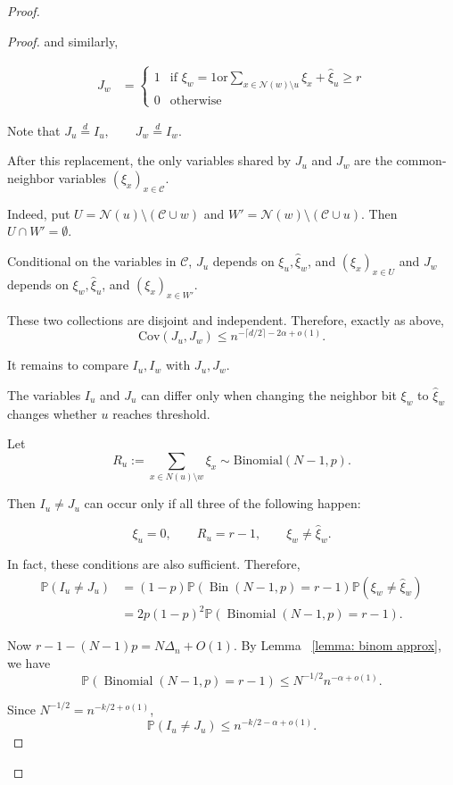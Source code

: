\documentclass[reqno,11pt]{amsart}
\renewcommand{\le}{\leqslant}
\renewcommand{\ge}{\geqslant}
\begin{document}
\begin{proof}
\begin{proof}
and similarly, 

\begin{align*}
J_w &=
\begin{cases}
1 & \text{if 
$\xi_w=1$
or
$\sum_{x\in \mathcal{N}(w)\setminus{u}}\xi_x
+\widehat\xi_u
\ge r$} \\
0 & \text{otherwise}
\end{cases}
\end{align*}

Note that  $J_u\overset d=I_u,
\qquad
J_w\overset d=I_w.$


After this replacement, the only variables shared by $J_u$ and $J_w$ are the common-neighbor variables $(\xi_x)_{x\in\mathcal C}$.

Indeed, put $U=\mathcal{N}(u)\setminus(\mathcal C\cup{w})$ and $W'=\mathcal{N}(w)\setminus(\mathcal C\cup{u})$. Then $U\cap W'=\emptyset$. 

Conditional on the variables in $\mathcal C$, $J_u$ depends on $\xi_u,\widehat\xi_w$, and $(\xi_x)_{x\in U}$ and $J_w$ depends on $\xi_w,\widehat\xi_u$, and $(\xi_x)_{x\in W'}$.

These two collections are disjoint and independent. Therefore, exactly as above,
$$
\text{Cov}(J_u,J_w)
\le
n^{-\lceil d/2\rceil-2\alpha+o(1)}.
$$

It remains to compare $I_u,I_w$ with $J_u,J_w$.

The variables $I_u$ and $J_u$ can differ only when changing the neighbor bit $\xi_w$ to $\widehat\xi_w$ changes whether $u$ reaches threshold.

Let $$ R_u
:=
\sum_{x\in N(u)\setminus{w}}\xi_x
\sim\text{Binomial}(N-1,p).
$$

Then $I_u\ne J_u$ can occur only if all three of the following happen:

$$
\xi_u=0,\qquad
R_u=r-1,\qquad
\xi_w\ne\widehat\xi_w.
$$

In fact, these conditions are also sufficient. Therefore,
\begin{align*}
\mathbb P(I_u\ne J_u)
&=
(1-p)
\mathbb P\left(
\operatorname{Bin}(N-1,p)=r-1
\right)
\mathbb P(\xi_w\ne\widehat\xi_w)\\
&=
2p(1-p)^2
\mathbb P\left(
\operatorname{Binomial}(N-1,p)=r-1
\right).
\end{align*}

Now $r-1-(N-1)p= N\Delta_n+O(1).$ By Lemma ~\ref{lemma: binom approx}, we have
$$
\mathbb P\left(
\operatorname{Binomial}(N-1,p)=r-1
\right)
\le
N^{-1/2}n^{-\alpha+o(1)}.
$$

Since $N^{-1/2}=n^{-k/2+o(1)}$,$$
\mathbb P(I_u\ne J_u)
\le
n^{-k/2-\alpha+o(1)}.
$$



\end{proof}
\end{proof}
\end{document}
